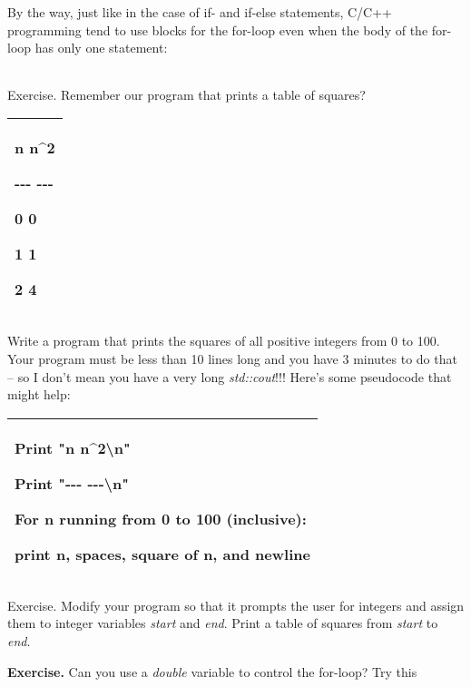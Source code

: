 \documentclass[
]{article}
\begin{document}
\begin{longtable}[]{@{}@{}}
\toprule
\endhead
\bottomrule
\end{longtable}

By the way, just like in the case of if- and if-else statements, C/C++
programming tend to use blocks for the for-loop even when the body of
the for-loop has only one statement:

\begin{longtable}[]{@{}@{}}
\toprule
\endhead
\bottomrule
\end{longtable}

Exercise. Remember our program that prints a table of squares?

\begin{longtable}[]{@{}l@{}}
\toprule
\endhead
\begin{minipage}[t]{0.97\columnwidth}\raggedright
n n\^{}2

-\/-\/- -\/-\/-

0 0

1 1

2 4\strut
\end{minipage}\tabularnewline
\bottomrule
\end{longtable}

Write a program that prints the squares of all positive integers from 0
to 100. Your program must be less than 10 lines long and you have 3
minutes to do that -- so I don't mean you have a very long
\emph{std::cout}!!! Here's some pseudocode that might help:

\begin{longtable}[]{@{}l@{}}
\toprule
\endhead
\begin{minipage}[t]{0.97\columnwidth}\raggedright
Print "n n\^{}2\textbackslash n"

Print "-\/-\/- -\/-\/-\textbackslash n"

For n running from 0 to 100 (inclusive):

print n, spaces, square of n, and newline\strut
\end{minipage}\tabularnewline
\bottomrule
\end{longtable}

Exercise. Modify your program so that it prompts the user for integers
and assign them to integer variables \emph{start} and \emph{end}. Print
a table of squares from \emph{start} to \emph{end}.

\textbf{Exercise.} Can you use a \emph{double} variable to control the
for-loop? Try this
\end{document}

